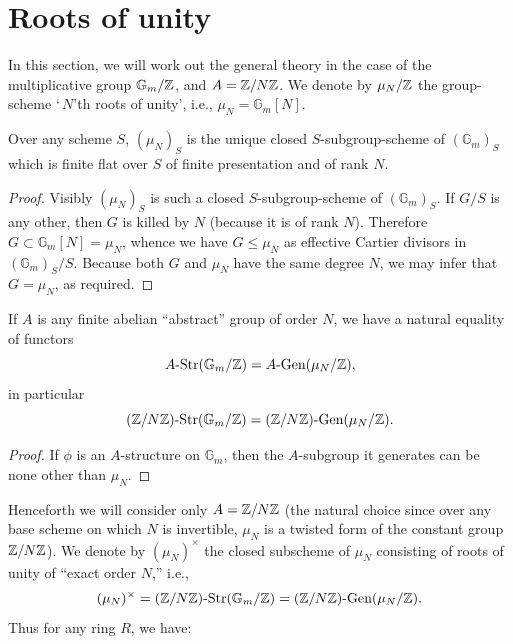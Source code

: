 \section{Roots of unity}\label{sec:1.12}

\kmitem\label{km:1.12.1}
In this section, we will work out the general theory in the case of the multiplicative group $\mathbb{G}_m/\mathbb{Z}$, and $A = \mathbb{Z}/N\mathbb{Z}$. We denote by $\mu_N/\mathbb{Z}$ the group-scheme `\,$N$'th roots of unity', i.e., $\mu_N = \mathbb{G}_m[N]$.

\begin{lemma}\label{lem:1.12.2}
Over any scheme $S$, $(\mu_N)_S$ is the unique closed $S$-subgroup-scheme of $(\mathbb{G}_m)_S$ which is finite flat over $S$ of finite presentation and of rank $N$.
\end{lemma}

\begin{proof}
Visibly $(\mu_N)_S$ is such a closed $S$-subgroup-scheme of $(\mathbb{G}_m)_S$. If $G/S$ is any other, then $G$ is killed by $N$ (because it is of rank $N$). Therefore $G \subset \mathbb{G}_m[N] = \mu_N$, whence we have $G \le \mu_N$ as effective Cartier divisors in $(\mathbb{G}_m)_S/S$. Because both $G$ and $\mu_N$ have the same degree $N$, we may infer that $G = \mu_N$, as required.
\end{proof}

\begin{corollary}\label{cor:1.12.3}
If $A$ is any finite abelian ``abstract'' group of order $N$, we have a natural equality of functors
\[
A\text{\rm -Str}(\mathbb{G}_m/\mathbb{Z}) = A\text{\rm -Gen}(\mu_N/\mathbb{Z}),
\]
in particular
\[
(\mathbb{Z}/N\mathbb{Z})\text{\rm -Str}(\mathbb{G}_m/\mathbb{Z}) = (\mathbb{Z}/N\mathbb{Z})\text{\rm -Gen}(\mu_N/\mathbb{Z}).
\]
\end{corollary}

\begin{proof}
If $\phi$ is an $A$-structure on $\mathbb{G}_m$, then the $A$-subgroup it generates can be none other than $\mu_N$.
\end{proof}

\kmitem\label{km:1.12.4}
Henceforth we will consider only $A = \mathbb{Z}/N\mathbb{Z}$ (the natural choice since over any base scheme on which $N$ is invertible, $\mu_N$ is a twisted form of the constant group $\mathbb{Z}/N\mathbb{Z}$). We denote by $(\mu_N)^\times$ the closed subscheme of $\mu_N$ consisting of roots of unity of ``exact order $N$,'' i.e.,
\[
(\mu_N)^\times = (\mathbb{Z}/N\mathbb{Z})\text{\rm -Str}(\mathbb{G}_m/\mathbb{Z}) = (\mathbb{Z}/N\mathbb{Z})\text{\rm -Gen}(\mu_N/\mathbb{Z}).
\]
Thus for any ring $R$, we have:


